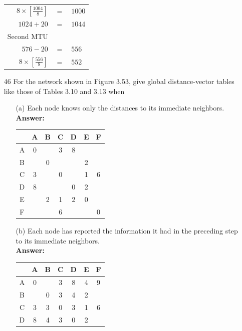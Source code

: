 \documentclass[a4paper]{article}
\begin{document}
\begin{itemize}
\begin{tabular}{r c l}
	      	$8 \times [\frac{1004}{8}]$ & $=$ & $1000$ \\
	      	$1024 + 20$                 & $=$ & $1044$ \\
	      	Second MTU                  &     &        \\
	      	$576 - 20$                  & $=$ & $556$  \\
	      	$8 \times [\frac{556}{8}]$  & $=$ & $552$  \\
	      \end{tabular}
	\item[46] For the network shown in Figure 3.53, give global distance-vector tables like those of Tables 3.10 and 3.13 when
	      \begin{itemize}
	      	\item[(a)] Each node knows only the distances to its immediate neighbors. \\
	      	      \textbf{Answer:} \\
	      	      \begin{tabular}{|c|c|c|c|c|c|c|}
	      	      	\hline
	      	      	  & A & B & C & D & E & F \\
	      	      	\hline
	      	      	A & 0 &   & 3 & 8 &   &   \\
	      	      	B &   & 0 &   &   & 2 &   \\
	      	      	C & 3 &   & 0 &   & 1 & 6 \\
	      	      	D & 8 &   &   & 0 & 2 &   \\
	      	      	E &   & 2 & 1 & 2 & 0 &   \\
	      	      	F &   &   & 6 &   &   & 0 \\
	      	      	\hline						
	      	      \end{tabular}
	      	\item[(b)] Each node has reported the information it had in the preceding step to its immediate neighbors. \\
	      	      \textbf{Answer:} \\
	      	      \begin{tabular}{|c|c|c|c|c|c|c|}
	      	      	\hline
	      	      	  & A & B & C & D & E & F \\
	      	      	\hline
	      	      	A & 0 &   & 3 & 8 & 4 & 9 \\
	      	      	B &   & 0 & 3 & 4 & 2 &   \\
	      	      	C & 3 & 3 & 0 & 3 & 1 & 6 \\
	      	      	D & 8 & 4 & 3 & 0 & 2 &   \\

\end{tabular}
\end{itemize}
\end{itemize}
\end{document}
